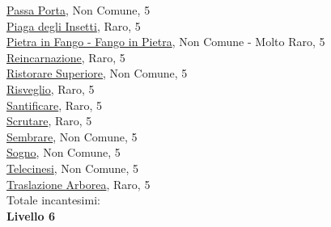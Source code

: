 \begin{multicols}{3}
{{\hyperlink{Passa Porta}{Passa Porta}, Non Comune, 5\\
\hyperlink{Piaga degli Insetti}{Piaga degli Insetti}, Raro, 5\\
\hyperlink{Pietra in Fango - Fango in Pietra}{Pietra in Fango - Fango in Pietra}, Non Comune - Molto Raro, 5\\
\hyperlink{Reincarnazione}{Reincarnazione}, Raro, 5\\
\hyperlink{Ristorare Superiore}{Ristorare Superiore}, Non Comune, 5\\
\hyperlink{Risveglio}{Risveglio}, Raro, 5\\
\hyperlink{Santificare}{Santificare}, Raro, 5\\
\hyperlink{Scrutare}{Scrutare}, Raro, 5\\
\hyperlink{Sembrare}{Sembrare}, Non Comune, 5\\
\hyperlink{Sogno}{Sogno}, Non Comune, 5\\
\hyperlink{Telecinesi}{Telecinesi}, Non Comune, 5\\
\hyperlink{Traslazione Arborea}{Traslazione Arborea}, Raro, 5\\

\medskip Totale incantesimi: \theinclvcinque\\

\textbf{Livello 6} 

}}
\end{multicols}
